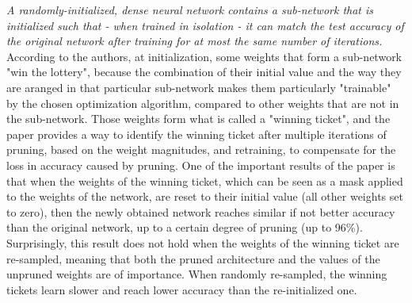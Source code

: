 \textit{A randomly-initialized, dense neural network contains a sub-network that is initialized such that - when trained in isolation - it can match the test accuracy of the original network after training for at most the same number of iterations.} \\

According to the authors, at initialization, some weights that form a sub-network "win the lottery", because the combination of their initial value and the way they are aranged in that particular sub-network makes them particularly "trainable" by the chosen optimization algorithm, compared to other weights that are not in the sub-network. Those weights form what is called a "winning ticket", and the paper provides a way to identify the winning ticket after multiple iterations of pruning, based on the weight magnitudes, and retraining, to compensate for the loss in accuracy caused by pruning. One of the important results of the paper is that when the weights of the winning ticket, which can be seen as a mask applied to the weights of the network, are reset to their initial value (all other weights set to zero), then the newly obtained network reaches similar if not better accuracy than the original network, up to a certain degree of pruning (up to 96\%). Surprisingly, this result does not hold when the weights of the winning ticket are re-sampled, meaning that both the pruned architecture and the values of the unpruned weights are of importance. When randomly re-sampled, the winning tickets learn slower and reach lower accuracy than the re-initialized one. \\

